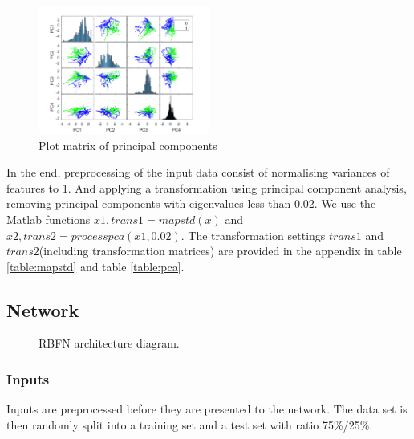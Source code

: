 \documentclass[a4paper, 11pt]{article}
\begin{document}
\begin{figure}[h]
  	\centering
    \includegraphics[width=0.5\textwidth]{../figures/pca_plotmatrix.png}
    \caption{Plot matrix of principal components}
	\label{fig:pca_plotmatrix}
\end{figure}


In the end, preprocessing of the input data consist of normalising variances of features to 1. And applying a transformation using principal component analysis, removing principal components with eigenvalues less than 0.02. We use the Matlab functions $x1, trans1 = mapstd(x)$ and $x2, trans2 = processpca(x1, 0.02)$. The transformation settings $trans1$ and $trans2$(including transformation matrices) are provided in the appendix in table \ref{table:mapstd} and table \ref{table:pca}.
  


\subsection{Network}
\begin{figure}[h]
\centering
  \caption{RBFN architecture diagram.}
  \label{fig:architecture}
\end{figure}

\subsubsection{Inputs}
Inputs are preprocessed before they are presented to the network. The data set is then randomly split into a training set and a test set with ratio 75\%/25\%.
\end{document}
